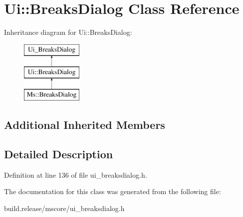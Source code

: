 \hypertarget{class_ui_1_1_breaks_dialog}{}\section{Ui\+:\+:Breaks\+Dialog Class Reference}
\label{class_ui_1_1_breaks_dialog}
Inheritance diagram for Ui\+:\+:Breaks\+Dialog\+:\begin{figure}[H]
\begin{center}
\leavevmode
\includegraphics[height=3.000000cm]{class_ui_1_1_breaks_dialog}
\end{center}
\end{figure}
\subsection*{Additional Inherited Members}


\subsection{Detailed Description}


Definition at line 136 of file ui\+\_\+breaksdialog.\+h.



The documentation for this class was generated from the following file\+:\begin{DoxyCompactItemize}
\item 
build.\+release/mscore/ui\+\_\+breaksdialog.\+h\end{DoxyCompactItemize}
